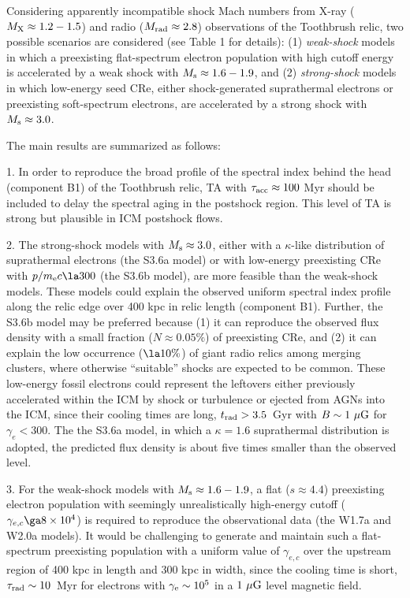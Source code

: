 \documentclass[twocolumn]{aastex61}
\def\muG{~{\mu\rm G}}
\begin{document}
Considering apparently incompatible shock Mach numbers from X-ray ($M_{\rm X}\approx 1.2-1.5$) and radio ($M_{\rm rad}\approx 2.8$) observations of the Toothbrush relic,
two possible scenarios are considered (see Table 1 for details):
(1) {\it weak-shock} models in which a preexisting flat-spectrum electron population with high cutoff energy is accelerated 
by a weak shock with $M_{\rm s}\approx 1.6-1.9$,
and (2) {\it strong-shock} models in which low-energy seed CRe, either shock-generated suprathermal electrons 
or preexisting soft-spectrum electrons, are accelerated by a strong shock with $M_{\rm s}\approx 3.0$.

The main results are summarized as follows:

1. In order to reproduce the broad profile of the spectral index behind the head (component B1) of the Toothbrush relic, 
TA with $\tau_{\rm acc}\approx 100$ Myr should be included to delay the spectral aging in the postshock region. This level of TA is strong but plausible in ICM postshock flows.

2. The strong-shock models with $M_{\rm s}\approx 3.0$, either with a
$\kappa$-like distribution of suprathermal electrons (the S3.6a model) or with low-energy preexisting CRe
with $p/m_{\rm e}c\la 300$ (the S3.6b model), are more feasible than the weak-shock models. 
These models could explain the observed uniform spectral index profile along
the relic edge over 400 kpc in relic length (component B1).
Further, the S3.6b model may be preferred
because (1) it can reproduce the observed flux density with a small fraction ($N\approx 0.05\%$) of preexisting CRe,
and (2) it can explain the low occurrence ($\la 10 \%$) of giant radio relics among merging clusters, 
where otherwise ``suitable'' shocks are expected to be common.
These low-energy fossil electrons could represent the leftovers either previously accelerated within the ICM by 
shock or turbulence or ejected from AGNs into the ICM, since their cooling times are long, $t_{\rm rad}> 3.5$~Gyr 
with $B\sim 1 \muG$ for $\gamma_{e} <300$.
The the S3.6a model, in which a $\kappa=1.6$ suprathermal distribution is adopted, the predicted flux density is about
five times smaller than the observed level.

3. For the weak-shock models with $M_{\rm s}\approx 1.6-1.9$,
a flat ($s\approx 4.4$) preexisting electron population with seemingly unrealistically high-energy cutoff 
($\gamma_{e,c}\ga 8\times 10^4$) is required to reproduce the observational data (the W1.7a and W2.0a models).
It would be challenging to generate and maintain such a flat-spectrum preexisting population with a
uniform value of $\gamma_{e,c}$ over the upstream region of 400 kpc in length and $300$ kpc in width,
since the cooling time is short, $\tau_{\rm rad} \sim 10$~Myr
for electrons with $\gamma_{\rm e} \sim 10^5$ in a $1\muG$ level magnetic field.
\end{document}
